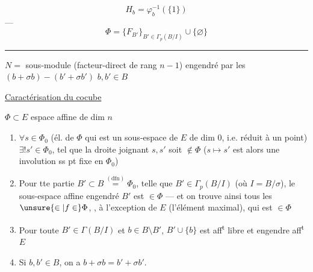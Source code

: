 \[
 H_b=\varphi_b^{-1}(\{1\})
\]
---
\[
 \Phi=\{F_{B'}\}_{B'\in\Gamma_p(B/I)}\cup\{\varnothing\}
\]
\noindent\rule{\linewidth}{0.4pt}

$N=$ sous-module (facteur-direct de rang $n-1$) engendré par les $(b+\sigma b)-(b'+\sigma b')$ $b,b'\in B$

\uline{Caractérisation du cocube}

$\Phi\subset E$ espace affine de dim $n$

\begin{enumerate}[label=\alph*)]
\item $\forall s\in\Phi_0$ (él. de $\Phi$ qui est un sous-espace de $E$ de dim 0, i.e. réduit à un point) $\exists!s'\in\Phi_0$,  tel que la droite joignant $s,s'$ soit $\notin\Phi$ ($s\mapsto s'$ est alors une involution ss pt fixe en $\Phi_0$) 
\item Pour tte partie $B'\subset B\overset{(\mathrm{dfn})}=\Phi_0$, telle que $B'\in\Gamma_p(B/I)$ (où $I=B/\sigma$), le sous-espace  affine engendré  $B'$ est $\in\Phi$ ---  et on trouve ainsi tous les $\unsure{\in|f\in}\Phi$, , à l'exception de $E$ (l'élément maximal), qui est $\in\Phi$
\item Pour toute $B'\in\Gamma(B/I)$ et $b\in B\setminus B'$, $B'\cup\{b\}$ est aff\textsuperscript{t} libre et engendre aff\textsuperscript{t} $E$
\item Si $b,b'\in B$, on a $b+\sigma b=b'+\sigma b'$.
\end{enumerate}
